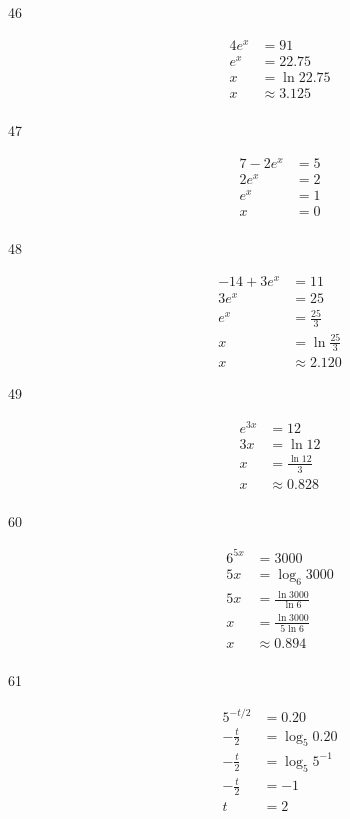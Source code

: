 \documentclass[fleqn,addpoints]{exam}
\begin{document}
\begin{description}
\item[46]
\begin{align*}
  4 e^x &= 91 \\
  e^x &= 22.75 \\
  x &= \ln 22.75 \\  
  x &\approx 3.125 \\
\end{align*}

\item[47]
\begin{align*}
  7 - 2e^x &= 5 \\
   2e^x &= 2 \\
   e^x &= 1 \\
   x &= 0 \\
\end{align*}

\item[48]
\begin{align*}
  -14 + 3e^x &= 11 \\
  3e^x &= 25 \\
  e^x &= \frac{25}{3} \\
  x &= \ln \frac{25}{3} \\
  x &\approx 2.120
\end{align*}

\item[49]
\begin{align*}
  e^{3x} &= 12 \\
  3x &= \ln 12 \\
  x &= \frac{\ln 12}{3} \\
  x &\approx 0.828 \\
\end{align*}

\item[60]
\begin{align*}
  6^{5x} &= 3000 \\
  5x &= \log_6 3000 \\
  5x &= \frac{\ln 3000}{\ln 6} \\
  x &= \frac{\ln 3000}{5 \ln 6} \\
  x &\approx 0.894 \\
\end{align*}

\item[61]
\begin{align*}
  5^{-t/2} &= 0.20 \\
  -\frac{t}{2} &= \log_5 0.20 \\
  -\frac{t}{2} &= \log_5 5^{-1} \\
  -\frac{t}{2} &= -1 \\
  t &= 2 \\
\end{align*}


\end{description}
\end{document}
